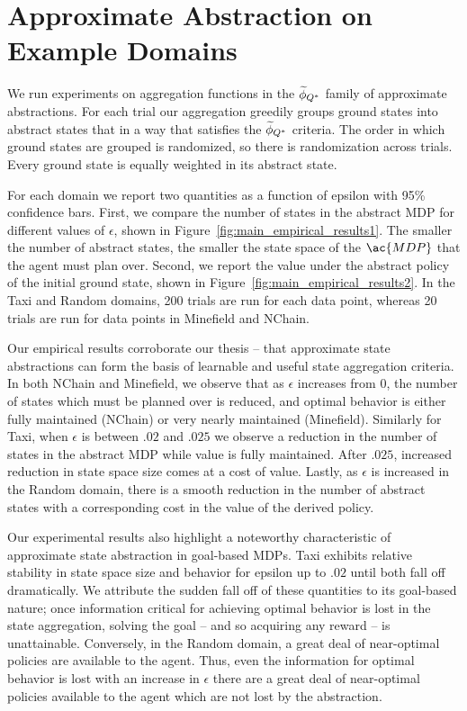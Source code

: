 \section{Approximate Abstraction on Example Domains}
We run experiments on aggregation functions in the $\widetilde \phi_{Q^*}$ family of approximate abstractions. For each trial our aggregation greedily groups ground states into abstract states that in a way that satisfies the $\widetilde \phi_{Q^*}$ criteria. The order in which ground states are grouped is randomized, so there is randomization across trials. Every ground state is equally weighted in its abstract state.

For each domain we report two quantities as a function of epsilon with 95\% confidence bars. First, we compare the number of states in the abstract \ac{MDP} for different values of $\epsilon$, shown in Figure~\ref{fig:main_empirical_results1}. The smaller the number of abstract states, the smaller the state space of the $\ac{MDP}$ that the agent must plan over. Second, we report the value under the abstract policy of the initial ground state, shown in Figure~\ref{fig:main_empirical_results2}. In the Taxi and Random domains, 200 trials are run for each data point, whereas 20 trials are run for data points in Minefield and NChain.


Our empirical results corroborate our thesis -- that approximate state abstractions can form the basis of learnable and useful state aggregation criteria. In both NChain and Minefield, we observe that as $\epsilon$ increases from $0$, the number of states which must be planned over is reduced, and optimal behavior is either fully maintained (NChain) or very nearly maintained (Minefield). Similarly for Taxi, when $\epsilon$ is between $.02$ and $.025$ we observe a reduction in the number of states in the abstract \ac{MDP} while value is fully maintained. After $.025$, increased reduction in state space size comes at a cost of value. Lastly, as $\epsilon$ is increased in the Random domain, there is a smooth reduction in the number of abstract states with a corresponding cost in the value of the derived policy.

Our experimental results also highlight a noteworthy characteristic of approximate state abstraction in goal-based \acp{MDP}. Taxi exhibits relative stability in state space size and behavior for epsilon up to $.02$ until both fall off dramatically. We attribute the sudden fall off of these quantities to its goal-based nature; once information critical for achieving optimal behavior is lost in the state aggregation, solving the goal -- and so acquiring any reward -- is unattainable. Conversely, in the Random domain, a great deal of near-optimal policies are available to the agent. Thus, even the information for optimal behavior is lost with an increase in $\epsilon$ there are a great deal of near-optimal policies available to the agent which are not lost by the abstraction.

